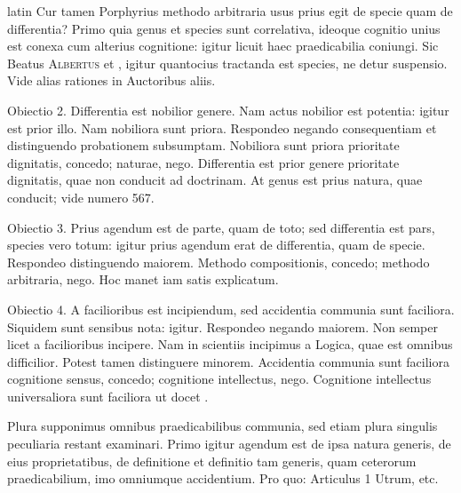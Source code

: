 \begin{otherlanguage*}{latin}
\pstart
  Cur tamen Porphyrius methodo arbitraria usus prius egit de specie quam de differentia? Primo quia genus et species sunt correlativa, ideoque cognitio unius est conexa cum alterius cognitione: igitur licuit haec praedicabilia coniungi. Sic Beatus \textsc{Albertus} et , igitur quantocius tractanda est species, ne detur suspensio. Vide alias rationes in Auctoribus aliis. 
\pend

\pstart
  Obiectio 2. Differentia est nobilior genere. Nam actus nobilior est potentia: igitur est prior illo. Nam nobiliora sunt priora. Respondeo negando consequentiam et distinguendo probationem subsumptam. Nobiliora sunt priora prioritate dignitatis, concedo; naturae, nego. Differentia est prior genere prioritate dignitatis, quae non conducit ad doctrinam. At genus est prius natura, quae conducit; vide numero 567. 
\pend

\pstart
  Obiectio 3. Prius agendum est de parte, quam de toto; sed differentia est pars, species vero totum: igitur prius agendum erat de differentia, quam de specie. Respondeo distinguendo maiorem. Methodo compositionis, concedo; methodo arbitraria, nego. Hoc manet iam satis explicatum. 
\pend

\pstart
  Obiectio 4. A facilioribus est incipiendum, sed  accidentia communia sunt faciliora. Siquidem sunt sensibus nota: igitur. Respondeo negando maiorem. Non semper licet a facilioribus incipere. Nam in scientiis incipimus a Logica, quae est omnibus difficilior. Potest tamen distinguere minorem. Accidentia communia sunt faciliora cognitione sensus, concedo; cognitione intellectus, nego. Cognitione intellectus universaliora sunt faciliora ut docet  . 
\pend

        \pstart
        \pend
      
\pstart
 Plura supponimus omnibus praedicabilibus communia, sed etiam plura singulis peculiaria restant examinari. Primo igitur agendum est de ipsa natura generis, de eius proprietatibus, de definitione et definitio tam generis, quam ceterorum praedicabilium, imo omniumque accidentium. Pro quo: Articulus 1 Utrum, etc. 
\pend


\end{otherlanguage*}
